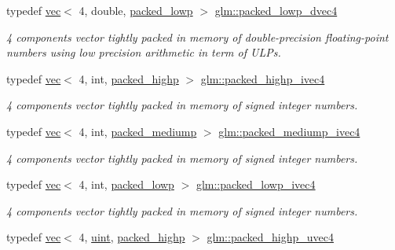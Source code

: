 \begin{DoxyCompactItemize}
typedef \hyperlink{structglm_1_1vec}{vec}$<$ 4, double, \hyperlink{namespaceglm_a36ed105b07c7746804d7fdc7cc90ff25ac36a4bd74559be2c0b65bc48e5953b8b}{packed\+\_\+lowp} $>$ \hyperlink{group__gtc__type__aligned_ga54190c1986b9a3653bf49fddd81e753b}{glm\+::packed\+\_\+lowp\+\_\+dvec4}
\begin{DoxyCompactList}\small\item\em 4 components vector tightly packed in memory of double-\/precision floating-\/point numbers using low precision arithmetic in term of U\+L\+Ps. \end{DoxyCompactList}\item 
typedef \hyperlink{structglm_1_1vec}{vec}$<$ 4, int, \hyperlink{namespaceglm_a36ed105b07c7746804d7fdc7cc90ff25a8e8791ee77fe079b1291f710d88031bf}{packed\+\_\+highp} $>$ \hyperlink{group__gtc__type__aligned_gabf988b7dc66612bc1d4c9ce44d5b5642}{glm\+::packed\+\_\+highp\+\_\+ivec4}
\begin{DoxyCompactList}\small\item\em 4 components vector tightly packed in memory of signed integer numbers. \end{DoxyCompactList}\item 
typedef \hyperlink{structglm_1_1vec}{vec}$<$ 4, int, \hyperlink{namespaceglm_a36ed105b07c7746804d7fdc7cc90ff25a9604654c3b137cd7898689fd34b25bc0}{packed\+\_\+mediump} $>$ \hyperlink{group__gtc__type__aligned_gaea233dbda2d6eccdc4b72178eea9430f}{glm\+::packed\+\_\+mediump\+\_\+ivec4}
\begin{DoxyCompactList}\small\item\em 4 components vector tightly packed in memory of signed integer numbers. \end{DoxyCompactList}\item 
typedef \hyperlink{structglm_1_1vec}{vec}$<$ 4, int, \hyperlink{namespaceglm_a36ed105b07c7746804d7fdc7cc90ff25ac36a4bd74559be2c0b65bc48e5953b8b}{packed\+\_\+lowp} $>$ \hyperlink{group__gtc__type__aligned_ga4f09d3093b0d71b2348a5a680f6badbd}{glm\+::packed\+\_\+lowp\+\_\+ivec4}
\begin{DoxyCompactList}\small\item\em 4 components vector tightly packed in memory of signed integer numbers. \end{DoxyCompactList}\item 
typedef \hyperlink{structglm_1_1vec}{vec}$<$ 4, \hyperlink{group__core__precision_ga4fd29415871152bfb5abd588334147c8}{uint}, \hyperlink{namespaceglm_a36ed105b07c7746804d7fdc7cc90ff25a8e8791ee77fe079b1291f710d88031bf}{packed\+\_\+highp} $>$ \hyperlink{group__gtc__type__aligned_ga769bab317264c023f8ee77897e4b5894}{glm\+::packed\+\_\+highp\+\_\+uvec4}

\end{DoxyCompactItemize}
